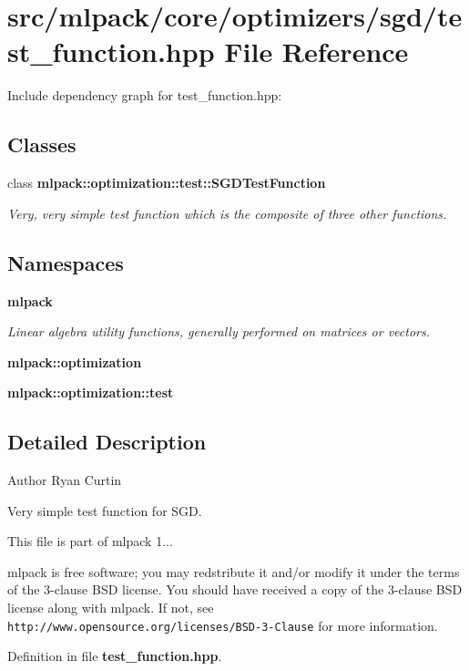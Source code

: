 \section{src/mlpack/core/optimizers/sgd/test\-\_\-function.hpp File Reference}
\label{test__function_8hpp}
Include dependency graph for test\-\_\-function.\-hpp\-:
\subsection*{Classes}
\begin{DoxyCompactItemize}
\item 
class {\bf mlpack\-::optimization\-::test\-::\-S\-G\-D\-Test\-Function}
\begin{DoxyCompactList}\small\item\em Very, very simple test function which is the composite of three other functions. \end{DoxyCompactList}\end{DoxyCompactItemize}
\subsection*{Namespaces}
\begin{DoxyCompactItemize}
\item 
{\bf mlpack}
\begin{DoxyCompactList}\small\item\em Linear algebra utility functions, generally performed on matrices or vectors. \end{DoxyCompactList}\item 
{\bf mlpack\-::optimization}
\item 
{\bf mlpack\-::optimization\-::test}
\end{DoxyCompactItemize}


\subsection{Detailed Description}
\begin{DoxyAuthor}{Author}
Ryan Curtin
\end{DoxyAuthor}
Very simple test function for S\-G\-D.

This file is part of mlpack 1...

mlpack is free software; you may redstribute it and/or modify it under the terms of the 3-\/clause B\-S\-D license. You should have received a copy of the 3-\/clause B\-S\-D license along with mlpack. If not, see {\tt http\-://www.\-opensource.\-org/licenses/\-B\-S\-D-\/3-\/\-Clause} for more information. 

Definition in file {\bf test\-\_\-function.\-hpp}.

